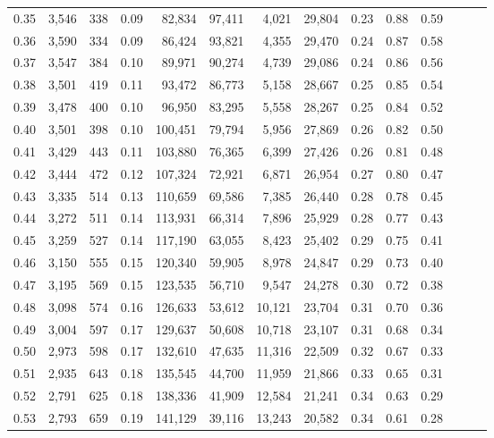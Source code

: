 \begin{tabular}{rrrrrrrrrrrrrr}
0.35 &  3,546 &  338 &  0.09 &   82,834 &   97,411 &   4,021 &  29,804 &  0.23 &  0.88 &      0.59 \\
0.36 &  3,590 &  334 &  0.09 &   86,424 &   93,821 &   4,355 &  29,470 &  0.24 &  0.87 &      0.58 \\
0.37 &  3,547 &  384 &  0.10 &   89,971 &   90,274 &   4,739 &  29,086 &  0.24 &  0.86 &      0.56 \\
0.38 &  3,501 &  419 &  0.11 &   93,472 &   86,773 &   5,158 &  28,667 &  0.25 &  0.85 &      0.54 \\
0.39 &  3,478 &  400 &  0.10 &   96,950 &   83,295 &   5,558 &  28,267 &  0.25 &  0.84 &      0.52 \\
0.40 &  3,501 &  398 &  0.10 &  100,451 &   79,794 &   5,956 &  27,869 &  0.26 &  0.82 &      0.50 \\
0.41 &  3,429 &  443 &  0.11 &  103,880 &   76,365 &   6,399 &  27,426 &  0.26 &  0.81 &      0.48 \\
0.42 &  3,444 &  472 &  0.12 &  107,324 &   72,921 &   6,871 &  26,954 &  0.27 &  0.80 &      0.47 \\
0.43 &  3,335 &  514 &  0.13 &  110,659 &   69,586 &   7,385 &  26,440 &  0.28 &  0.78 &      0.45 \\
0.44 &  3,272 &  511 &  0.14 &  113,931 &   66,314 &   7,896 &  25,929 &  0.28 &  0.77 &      0.43 \\
0.45 &  3,259 &  527 &  0.14 &  117,190 &   63,055 &   8,423 &  25,402 &  0.29 &  0.75 &      0.41 \\
0.46 &  3,150 &  555 &  0.15 &  120,340 &   59,905 &   8,978 &  24,847 &  0.29 &  0.73 &      0.40 \\
0.47 &  3,195 &  569 &  0.15 &  123,535 &   56,710 &   9,547 &  24,278 &  0.30 &  0.72 &      0.38 \\
0.48 &  3,098 &  574 &  0.16 &  126,633 &   53,612 &  10,121 &  23,704 &  0.31 &  0.70 &      0.36 \\
0.49 &  3,004 &  597 &  0.17 &  129,637 &   50,608 &  10,718 &  23,107 &  0.31 &  0.68 &      0.34 \\
0.50 &  2,973 &  598 &  0.17 &  132,610 &   47,635 &  11,316 &  22,509 &  0.32 &  0.67 &      0.33 \\
0.51 &  2,935 &  643 &  0.18 &  135,545 &   44,700 &  11,959 &  21,866 &  0.33 &  0.65 &      0.31 \\
0.52 &  2,791 &  625 &  0.18 &  138,336 &   41,909 &  12,584 &  21,241 &  0.34 &  0.63 &      0.29 \\
0.53 &  2,793 &  659 &  0.19 &  141,129 &   39,116 &  13,243 &  20,582 &  0.34 &  0.61 &      0.28 \\

\end{tabular}
